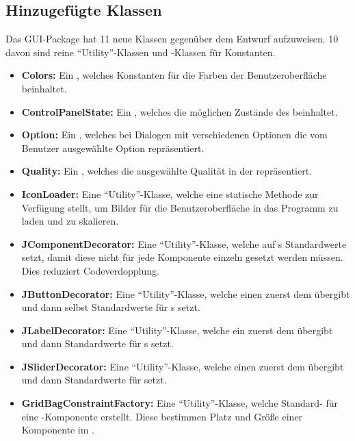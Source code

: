 \subsection{Hinzugefügte Klassen}


Das GUI-Package hat 11 neue Klassen gegenüber dem Entwurf aufzuweisen. 10 davon sind reine \enquote{Utility}-Klassen und -Klassen für Konstanten.

\begin{itemize}
	\item \textbf{Colors:}
Ein , welches Konstanten für die Farben der Benutzeroberfläche beinhaltet.

	\item \textbf{ControlPanelState:} Ein , welches die möglichen Zustände des  beinhaltet.

	\item \textbf{Option:} Ein , welches bei Dialogen mit verschiedenen Optionen die vom Benutzer ausgewählte Option repräsentiert.

	\item \textbf{Quality:} Ein , welches die ausgewählte Qualität in der  repräsentiert.

	\item \textbf{IconLoader:} Eine \enquote{Utility}-Klasse, welche eine statische Methode zur Verfügung stellt, um Bilder für die Benutzeroberfläche in das Programm zu laden und zu skalieren.

	\item \textbf{JComponentDecorator:} Eine \enquote{Utility}-Klasse, welche auf s Standardwerte setzt, damit diese nicht für jede Komponente einzeln gesetzt werden müssen. Dies reduziert Codeverdopplung.

	\item \textbf{JButtonDecorator:} Eine \enquote{Utility}-Klasse, welche einen  zuerst dem  übergibt und dann selbst Standardwerte für s setzt.

	\item \textbf{JLabelDecorator:} Eine \enquote{Utility}-Klasse, welche ein  zuerst dem  übergibt und dann Standardwerte für s setzt.

	\item \textbf{JSliderDecorator:} Eine \enquote{Utility}-Klasse, welche einen  zuerst dem  übergibt und dann Standardwerte für  setzt.

	\item \textbf{GridBagConstraintFactory:} Eine \enquote{Utility}-Klasse, welche Standard- für eine -Komponente erstellt. Diese bestimmen Platz und Größe einer Komponente im .

\end{itemize}

